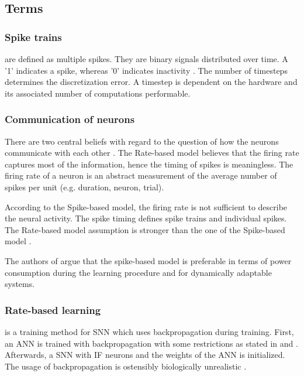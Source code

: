 \newcommand\rbModel{Rate-based model}
\newcommand\sbModel{Spike-based model}
\subsection{Terms}
\label{subsec:terms}

\subsubsection{Spike trains}
are defined as multiple spikes.
They are binary signals distributed over time.
A '1' indicates a spike, whereas '0' indicates inactivity \cite{DIET_SNN}.
The number of timesteps determines the discretization error.
A timestep is dependent on the hardware and its associated number of computations performable.

\subsubsection{Communication of neurons}
\label{subsubsec:communication}
There are two central beliefs with regard to the question of how the neurons communicate with each other \cite{spike_vs_rate}.
The \rbModel{} believes that the firing rate captures most of the information, hence the timing of spikes is meaningless.
The firing rate of a neuron is an abstract measurement of the average number of spikes per unit (e.g. duration, neuron, trial).

According to the \sbModel{}, the firing rate is not sufficient to describe the neural activity.
The spike timing defines spike trains and individual spikes.
The \rbModel{} assumption is stronger than the one of the \sbModel{} \cite{spike_vs_rate}.

The authors of \cite{SNN} argue that the spike-based model is preferable in terms of power consumption 
during the learning procedure and for dynamically adaptable systems.


\subsubsection{Rate-based learning} is a training method for \ac{SNN} which uses backpropagation during training. 
First, an \ac{ANN} is trained with backpropagation with some restrictions as stated in \cite{DIET_SNN} and \cite{ANN_SNN_conversion}.
Afterwards, a \ac{SNN} with \ac{IF} neurons and the weights of the \ac{ANN} is initialized.
The usage of backpropagation is ostensibly biologically unrealistic \cite{SNN,STDP_like}.
